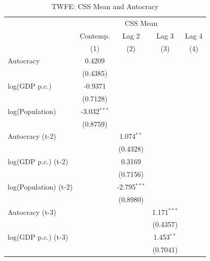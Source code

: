 
\begin{table}[htbp]
   \caption{\label{tab:twfe} TWFE: CSS Mean and Autocracy}
   \bigskip
   \centering
   \begin{tabular}{lcccc}
      \toprule
       & \multicolumn{4}{c}{CSS Mean}\\
                            & Contemp.       & Lag 2          & Lag 3         & Lag 4 \\   
                            & (1)            & (2)            & (3)           & (4)\\  
      \midrule 
      Autocracy             & 0.4209         &                &               &   \\   
                            & (0.4385)       &                &               &   \\   
      log(GDP p.c.)         & -0.9371        &                &               &   \\   
                            & (0.7128)       &                &               &   \\   
      log(Population)       & -3.032$^{***}$ &                &               &   \\   
                            & (0.8759)       &                &               &   \\   
      Autocracy (t-2)       &                & 1.074$^{**}$   &               &   \\   
                            &                & (0.4328)       &               &   \\   
      log(GDP p.c.) (t-2)   &                & 0.3169         &               &   \\   
                            &                & (0.7156)       &               &   \\   
      log(Population) (t-2) &                & -2.795$^{***}$ &               &   \\   
                            &                & (0.8980)       &               &   \\   
      Autocracy (t-3)       &                &                & 1.171$^{***}$ &   \\   
                            &                &                & (0.4357)      &   \\   
      log(GDP p.c.) (t-3)   &                &                & 1.453$^{**}$  &   \\   
                            &                &                & (0.7041)      &   \\   

\end{tabular}
\end{table}
